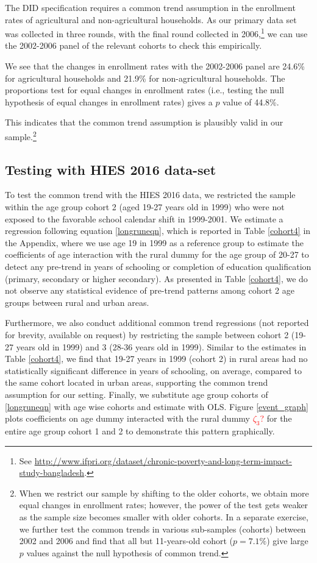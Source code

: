 \documentclass[12pt,letterpaper]{article}
\newcommand{\SAdded}[1]{\textcolor{red}{#1}}
\newcommand{\0}{\ensuremath{\mbox{\boldmath $0$}}}
\begin{document}
The DID specification requires a common trend assumption in the enrollment rates of agricultural and non-agricultural households. As our primary data set was collected in three rounds, with the final round collected in 2006,\footnote{See \url{http://www.ifpri.org/dataset/chronic-poverty-and-long-term-impact-study-bangladesh}.} we can use the 2002-2006 panel of the relevant cohorts to check this empirically. 

We see that the changes in enrollment rates with the 2002-2006 panel are 24.6\% for agricultural households and 21.9\% for non-agricultural households. The proportions test for equal changes in enrollment rates (i.e., testing the null hypothesis of equal changes in enrollment rates) gives a $p$ value of 44.8\%.

This indicates that the common trend assumption is plausibly valid in our sample.\footnote{When we restrict our sample by shifting to the older cohorts, we obtain more equal changes in enrollment rates; however, the power of the test gets weaker as the sample size becomes smaller with older cohorts. In a separate exercise, we further test the common trends in various sub-samples (cohorts) between 2002 and 2006 and find that all but 11-years-old cohort ($p=7.1\%$) give large $p$ values against the null hypothesis of common trend.}

\subsection{Testing with HIES 2016 data-set\label{subsec.cohort_trend_HIES}}

To test the common trend with the HIES 2016 data, we restricted the sample within the age group cohort 2 (aged 19-27 years old in 1999) who were not exposed to the favorable school calendar shift in 1999-2001. We estimate a regression following equation \ref{longruneqn}, which is reported in Table \ref{cohort4} in the Appendix, where we use age 19 in 1999 as a reference group to estimate the coefficients of age interaction with the rural dummy for the age group of 20-27 to detect any pre-trend in years of schooling or completion of education qualification (primary, secondary or higher secondary). As presented in Table \ref{cohort4}, we do not observe any statistical evidence of pre-trend patterns among cohort 2 age groups between rural and urban areas. 

Furthermore, we also conduct additional common trend regressions (not reported for brevity, available on request) by restricting the sample between cohort 2 (19-27 years old in 1999) and 3 (28-36 years old in 1999). Similar to the estimates in Table \ref{cohort4}, we find that 19-27 years in 1999 (cohort 2) in rural areas had no statistically significant difference in years of schooling, on average, compared to the same cohort located in urban areas, supporting the common trend assumption for our setting. Finally, we substitute age group cohorts of \eqref{longruneqn} with age wise cohorts and estimate with OLS. Figure \ref{event_graph} plots coefficients on age dummy interacted with the rural dummy \SAdded{$\zeta_{3}$?} for the entire age group cohort 1 and 2 to demonstrate this pattern graphically.  
\end{document}

